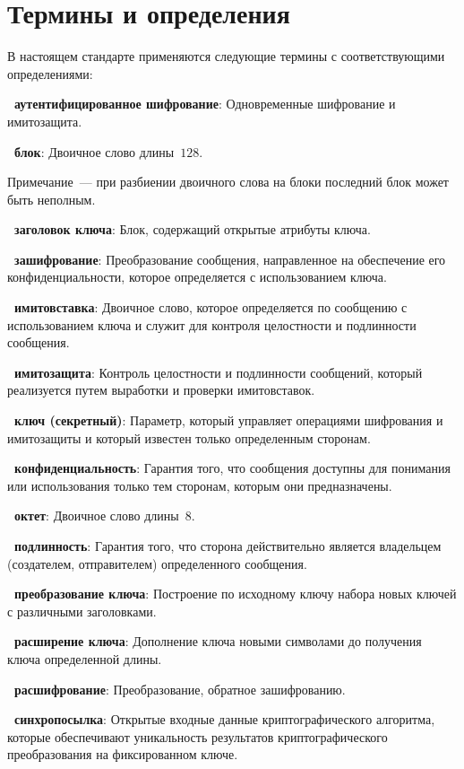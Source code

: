 \chapter{Термины и определения}

В настоящем стандарте применяются  
следующие термины с соответствующими определениями:

{\bf \thedefctr~аутентифицированное шифрование}:
Одновременные шифрование и имитозащита.

{\bf \thedefctr~блок}:
Двоичное слово длины~$128$.

\begin{note}
Примечание~--- при разбиении двоичного слова на блоки последний блок
может быть неполным.
\end{note}

{\bf \thedefctr~заголовок ключа}:
Блок, содержащий открытые атрибуты ключа.

{\bf \thedefctr~зашифрование}:
Преобразование сообщения,
направленное на обеспечение его конфиденциальности,
которое определяется с использованием ключа.

{\bf \thedefctr~имитовставка}:
Двоичное слово, 
которое определяется по сообщению с использованием ключа 
и служит для контроля целостности и подлинности сообщения.

{\bf \thedefctr~имитозащита}:
Контроль целостности и подлинности сообщений, 
который реализуется путем выработки и проверки имитовставок.

{\bf \thedefctr~ключ (секретный)}:
Параметр, который управляет операциями шифрования 
и имитозащиты и который известен только определенным сторонам.

{\bf \thedefctr~конфиденциальность}:
Гарантия того, что сообщения доступны для понимания или использования
только тем сторонам, которым они предназначены.

{\bf \thedefctr~октет}:
Двоичное слово длины~$8$.

{\bf \thedefctr~подлинность}:
Гарантия того, что сторона действительно является
владельцем (создателем, отправителем) определенного сообщения.

{\bf \thedefctr~преобразование ключа}:
Построение по исходному ключу набора новых ключей 
с различными заголовками.

{\bf \thedefctr~расширение ключа}:
Дополнение ключа новыми символами до получения ключа определенной длины.

{\bf \thedefctr~расшифрование}:
Преобразование, обратное зашифрованию.

{\bf \thedefctr~синхропосылка}:
Открытые входные данные криптографического алгоритма,
которые обеспечивают уникальность результатов 
криптографического преобразования на фиксированном ключе.

